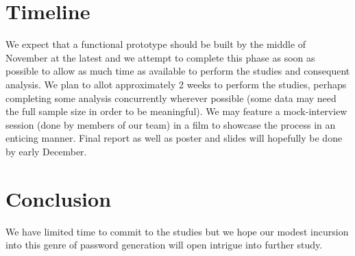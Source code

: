 \documentclass[conference]{IEEEtran}
\begin{document}
\section{Timeline}
We expect that a functional prototype should be built by the middle of November at the latest and we attempt to complete this phase as soon as possible to allow as much time as available to perform the studies and consequent analysis. We plan to allot approximately 2 weeks to perform the studies, perhaps completing some analysis concurrently wherever possible (some data may need the full sample size in order to be meaningful). We may feature a mock-interview session (done by members of our team) in a film to showcase the process in an enticing manner. Final report as well as poster and slides will hopefully be done by early December. 

\section{Conclusion}
We have limited time to commit to the studies but we hope our modest incursion into this genre of password generation will open intrigue into further study.


\end{document}
